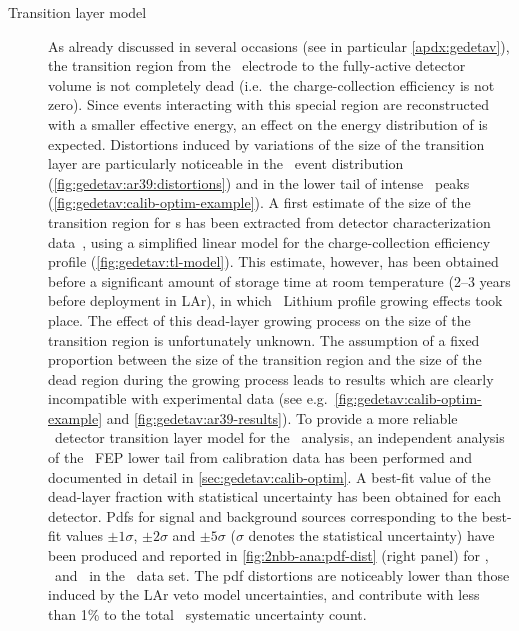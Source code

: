 \begin{description}
  \item[Transition layer model] As already discussed in several occasions (see in
    particular \cref{apdx:gedetav}), the transition region from the \nplus\ electrode to
    the fully-active detector volume is not completely dead (i.e.~the charge-collection
    efficiency is not zero). Since events interacting with this special region are
    reconstructed with a smaller effective energy, an effect on the energy distribution of
    is expected. Distortions induced by variations of the size of the transition layer are
    particularly noticeable in the \Arl\ event distribution
    (\cref{fig:gedetav:ar39:distortions}) and in the lower tail of intense \g\ peaks
    (\cref{fig:gedetav:calib-optim-example}). A first estimate of the size of the
    transition region for \bege{}s has been extracted from detector characterization
    data~\cite{Lehnert2016}, using a simplified linear model for the charge-collection
    efficiency profile (\cref{fig:gedetav:tl-model}). This estimate, however, has been
    obtained before a significant amount of storage time at room temperature (2--3 years
    before deployment in LAr), in which \nplus\ Lithium profile growing effects took
    place. The effect of this dead-layer growing process on the size of the transition
    region is unfortunately unknown. The assumption of a fixed proportion between the size
    of the transition region and the size of the dead region during the growing process
    leads to results which are clearly incompatible with experimental data (see
    e.g.~\cref{fig:gedetav:calib-optim-example} and \cref{fig:gedetav:ar39-results}).
    \newpar
    To provide a more reliable \bege\ detector transition layer model for the \nnbb\
    analysis, an independent analysis of the \Th\ FEP lower tail from calibration data has
    been performed and documented in detail in \cref{sec:gedetav:calib-optim}. A best-fit
    value of the dead-layer fraction with statistical uncertainty has been obtained for
    each detector. Pdfs for signal and background sources corresponding to the best-fit
    values $\pm1\sigma$, $\pm2\sigma$ and $\pm5\sigma$ ($\sigma$ denotes the statistical
    uncertainty) have been produced and reported in \cref{fig:2nbb-ana:pdf-dist} (right
    panel) for \kvn, \kvz\ and \nnbb\ in the \enrBEGeII\ data set. The pdf distortions are
    noticeably lower than those induced by the LAr veto model uncertainties, and
    contribute with less than 1\% to the total \thalftwo\ systematic uncertainty count.


\end{description}
